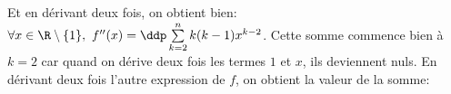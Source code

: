 \begin{correction}
\begin{enumerate}
Et en d\'erivant deux fois, on obtient bien: $\forall x\in\R\setminus\lbrace 1\rbrace,\ f^{\prime\prime}(x)=\ddp \sum\limits_{k=2}^{n} k(k-1)x^{k-2}$. Cette somme commence bien \`{a} $k=2$ car quand on d\'erive deux fois les termes $1$ et $x$, ils deviennent nuls. En d\'erivant deux fois l'autre expression de $f$, on obtient la valeur de la somme:\\ 
\vsec
 \begin{center}
\end{center}
\end{enumerate}
\end{correction}